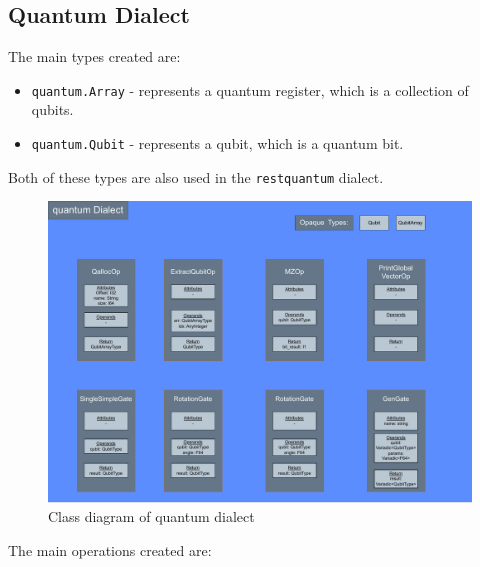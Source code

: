 \subsection{Quantum Dialect}
The main types created are:
\begin{itemize}
    \item \texttt{quantum.Array} - represents a quantum register, which is a
          collection of qubits.
    \item \texttt{quantum.Qubit} - represents a qubit, which is a quantum bit.
\end{itemize}
Both of these types are also used in the \texttt{restquantum} dialect.
\begin{figure}
    \centering
    \includegraphics[width=\textwidth]{images/quantum_dialect.pdf}
    \caption[Quantum Dialect]{Class diagram of quantum dialect}
    \label {fig:quantum_dialect}
\end{figure}
The main operations created are:
